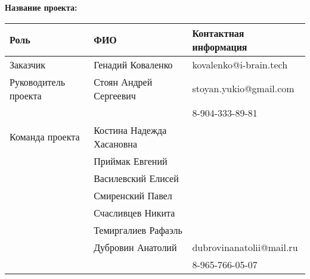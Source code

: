 \documentclass[a4paper,12pt]{article}
\begin{document}
\textbf{Название проекта: }

\vspace{5ex}


\begin{tabular}{|l|l|l|}
    \hline
    \textbf{Роль} & \textbf{ФИО} & \textbf{Контактная информация} \\
    \hline 
    Заказчик & Генадий Коваленко & kovalenko@i-brain.tech \\
    \hline
    Руководитель проекта & Стоян Андрей Сергеевич 
       & stoyan.yukio@gmail.com \\ 
     & & 8-904-333-89-81 \\ 
    \hline
    Команда проекта 
     & Костина Надежда Хасановна & \\ \cline{2-3}
     & Приймак Евгений & \\ \cline{2-3}
     & Василевский Елисей & \\ \cline{2-3}
     & Смиренский Павел & \\ \cline{2-3}
     & Счасливцев Никита & \\ \cline{2-3}
     & Темиргалиев Рафаэль & \\ \cline{2-3}
     & Дубровин Анатолий 
     & dubrovinanatolii@mail.ru \\ 
     & & 8-965-766-05-07 \\
    \hline
\end{tabular}
\end{document}
